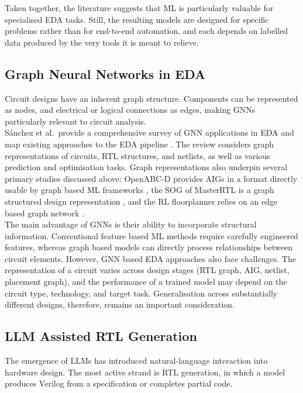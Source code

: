 \documentclass[conference]{IEEEtran}
\begin{document}
\noindent Taken together, the literature suggests that ML is particularly valuable for specialised EDA tasks. Still, the resulting models are designed for specific problems rather than for end-to-end automation, and each depends on labelled data produced by the very tools it is meant to relieve.

\subsection{Graph Neural Networks in EDA}\label{L2}

\noindent Circuit designs have an inherent graph structure. Components can be represented as nodes, and electrical or logical connections as edges, making GNNs particularly relevant to circuit analysis. \\

\noindent S{\'a}nchez et al.\ provide a comprehensive survey of GNN applications in EDA and map existing approaches to the EDA pipeline \cite{P3_Snchez2023}. The review considers graph representations of circuits, RTL structures, and netlists, as well as various prediction and optimisation tasks. Graph representations also underpin several primary studies discussed above: OpenABC-D provides AIGs in a format directly usable by graph based ML frameworks \cite{P9_Chowdhury2021}, the SOG of MasterRTL is a graph structured design representation \cite{P10_Fang2023}, and the RL floorplanner relies on an edge based graph network \cite{P8_Mirhoseini2021}.\\

\noindent The main advantage of GNNs is their ability to incorporate structural information. Conventional feature based ML methods require carefully engineered features, whereas graph based models can directly process relationships between circuit elements. However, GNN based EDA approaches also face challenges. The representation of a circuit varies across design stages (RTL graph, AIG, netlist, placement graph), and the performance of a trained model may depend on the circuit type, technology, and target task. Generalisation across substantially different designs, therefore, remains an important consideration.

\subsection{LLM Assisted RTL Generation}\label{L3}

\noindent The emergence of LLMs has introduced natural-language interaction into hardware design. The most active strand is RTL generation, in which a model produces Verilog from a specification or completes partial code.\\
\end{document}
